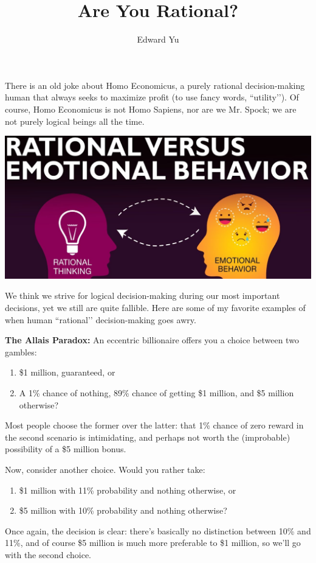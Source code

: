 \documentclass{article}
\title{Are You Rational?}
\author{Edward Yu}
\begin{document}
\maketitle
There is an old joke about Homo Economicus, a purely rational decision-making human that always seeks to maximize profit (to use fancy words, ``utility’’).
Of course, Homo Economicus is not Homo Sapiens, nor are we Mr. Spock; we are not purely logical beings all the time.
\begin{center}
    \includegraphics[scale=0.4]{images/rational.png}
\end{center}

We think we strive for logical decision-making during our most important decisions, yet we still are quite fallible. Here are some of my favorite examples of when human ``rational’’ decision-making goes awry.

\textbf{The Allais Paradox:} An eccentric billionaire offers you a choice between two gambles:
\begin{enumerate}
\item \$1 million, guaranteed, or
\item A 1\% chance of nothing, 89\% chance of getting \$1 million, and \$5 million otherwise?
\end{enumerate}
Most people choose the former over the latter: that 1\% chance of zero reward in the second scenario is intimidating, and perhaps not worth the (improbable) possibility of a \$5 million bonus.

Now, consider another choice. Would you rather take:
\begin{enumerate}
\item \$1 million with 11\% probability and nothing otherwise, or
\item \$5 million with 10\% probability and nothing otherwise?
\end{enumerate}
Once again, the decision is clear: there’s basically no distinction between 10\% and 11\%, and of course \$5 million is much more preferable to \$1 million, so we’ll go with the second choice.
\end{document}
